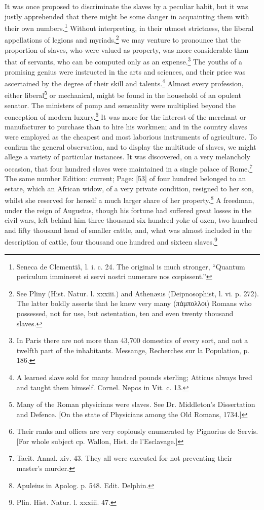 It was once proposed to discriminate the slaves by a peculiar habit, but it was justly apprehended that there might be some danger in acquainting them with their own numbers.\footnote{Seneca de Clementiâ, l. i. c. 24. The original is much stronger, \texthebrew{“}Quantum periculum immineret si servi nostri numerare nos cœpissent.\texthebrew{}”} Without interpreting, in their utmost strictness, the liberal appellations of legions and myriads,\footnote{See Pliny (Hist. Natur. l. xxxiii.) and Athenæus (Deipnosophist, l. vi. p. 272). The latter boldly asserts that he knew very many (\textgreek{πάμπολλοι}) Romans who possessed, not for use, but ostentation, ten and even twenty thousand slaves.} we may venture to pronounce that the proportion of slaves, who were valued as property, was more considerable than that of servants, who can be computed only as an expense.\footnote{In Paris there are not more than 43,700 domestics of every sort, and not a twelfth part of the inhabitants. Messange, Recherches sur la Population, p. 186.} The youths of a promising genius were instructed in the arts and sciences, and their price was ascertained by the degree of their skill and talents.\footnote{A learned slave sold for many hundred pounds sterling; Atticus always bred and taught them himself. Cornel. Nepos in Vit. c. 13.} Almost every profession, either liberal\footnote{Many of the Roman physicians were slaves. See Dr. Middleton\texthebrew{}’s Dissertation and Defence. [On the state of Physicians among the Old Romans, 1734.]} or mechanical, might be found in the household of an opulent senator. The ministers of pomp and sensuality were multiplied beyond the conception of modern luxury.\footnote{Their ranks and offices are very copiously enumerated by Pignorius de Servis. [For whole subject cp. Wallon, Hist. de l\texthebrew{}’Esclavage.]} It was more for the interest of the merchant or manufacturer to purchase than to hire his workmen; and in the country slaves were employed as the cheapest and most laborious instruments of agriculture. To confirm the general observation, and to display the multitude of slaves, we might allege a variety of particular instances. It was discovered, on a very melancholy occasion, that four hundred slaves were maintained in a single palace of Rome.\footnote{Tacit. Annal. xiv. 43. They all were executed for not preventing their master\texthebrew{}’s murder.} The same number Edition: current; Page: [53] of four hundred belonged to an estate, which an African widow, of a very private condition, resigned to her son, whilst she reserved for herself a much larger share of her property.\footnote{Apuleius in Apolog. p. 548. Edit. Delphin.} A freedman, under the reign of Augustus, though his fortune had suffered great losses in the civil wars, left behind him three thousand six hundred yoke of oxen, two hundred and fifty thousand head of smaller cattle, and, what was almost included in the description of cattle, four thousand one hundred and sixteen slaves.\footnote{Plin. Hist. Natur. l. xxxiii. 47.}

